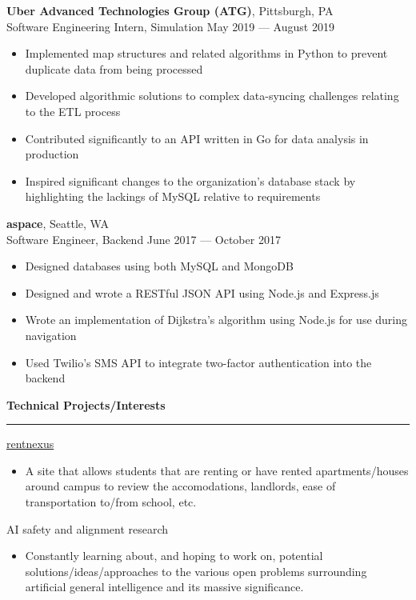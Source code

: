 \documentclass[11pt]{article}
\begin{document}
\begin{flushleft}
		\textbf{Uber Advanced Technologies Group (ATG)}, Pittsburgh, PA\\
		{\small Software Engineering Intern, Simulation \hfill May 2019 --- August 2019}
		\vspace{-1.5mm}
		\begin{itemize}
			\item Implemented map structures and related algorithms in Python to prevent duplicate data from being processed
			\vspace{-1.5mm}
			\item Developed algorithmic solutions to complex data-syncing challenges relating to the ETL process
			\vspace{-1.5mm}
			\item Contributed significantly to an API written in Go for data analysis in production
			\vspace{-1.5mm}
			\item Inspired significant changes to the organization's database stack by highlighting the lackings of MySQL relative to requirements
		\end{itemize}
	
		\textbf{aspace}, Seattle, WA\\
		{\small Software Engineer, Backend \hfill June 2017 --- October 2017}
		\vspace{-1.5mm}
		\begin{itemize}
			\item Designed databases using both MySQL and MongoDB
			\vspace{-1.5mm}
			\item Designed and wrote a RESTful JSON API using Node.js and Express.js
			\vspace{-1.5mm}
			\item Wrote an implementation of Dijkstra's algorithm using Node.js for use during navigation
			\vspace{-1.5mm}
			\item Used Twilio's SMS API to integrate two-factor authentication into the backend
		\end{itemize}
		
		\vspace{1.75mm}
		{\large \raggedright \textbf{Technical Projects/Interests}}
		\vspace{1.5mm}
	
		\hrule
	
		\vspace{2.25mm}
		\href{https://rentnexus.net}{rentnexus}
		\begin{itemize}
			\item A site that allows students that are renting or have rented apartments/houses around campus to review the accomodations, landlords, ease of transportation to/from school, etc.
		\end{itemize}
		AI safety and alignment research
		\begin{itemize}
			\item Constantly learning about, and hoping to work on, potential solutions/ideas/approaches to the various open problems surrounding artificial general intelligence and its massive significance.
		\end{itemize}
		

\end{flushleft}
\end{document}

